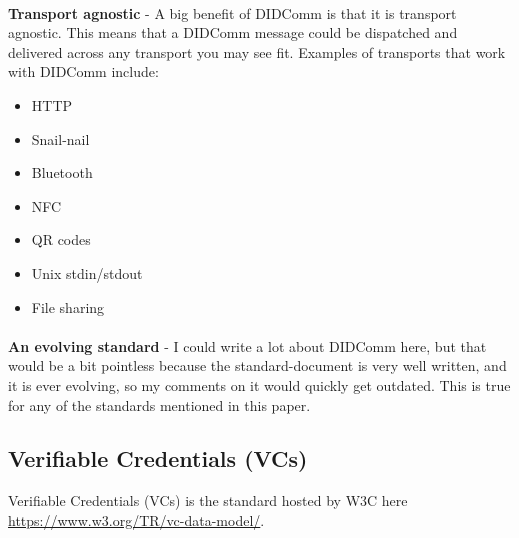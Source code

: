 \paragraph{}

\textbf{Transport agnostic} - A big benefit of DIDComm is that it is transport agnostic. This means that a DIDComm message could be dispatched and delivered across any transport you may see fit. Examples of transports that work with DIDComm include:

\begin{itemize}
\tightlist
\item
  HTTP
\item
  Snail-nail
\item
  Bluetooth
\item
  NFC
\item
  QR codes
\item
  Unix stdin/stdout
\item
  File sharing
\end{itemize}

\paragraph{}

\textbf{An evolving standard} - I could write a lot about DIDComm here, but that would be a bit
pointless because the standard-document is very well written, and it is
ever evolving, so my comments on it would quickly get outdated. This is
true for any of the standards mentioned in this paper.




\pagebreak



\hypertarget{verifiable-credentials-vcs}{%
\subsection{Verifiable Credentials
(VCs)}\label{verifiable-credentials-vcs}}

Verifiable Credentials (VCs) is the standard hosted by W3C here \url{https://www.w3.org/TR/vc-data-model/}.

\paragraph{}


